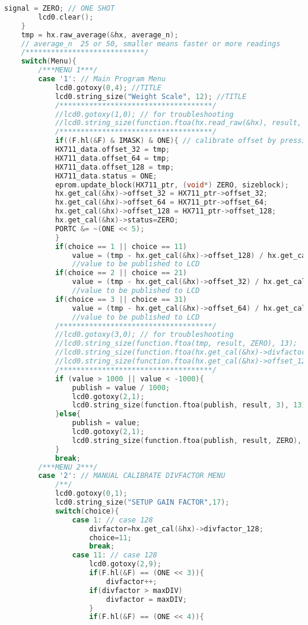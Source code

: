 \begin{lstlisting}[language=C, caption={main.c}, label=main-c, captionpos=b]
		signal = ZERO; // ONE SHOT
		lcd0.clear();
	}
	tmp = hx.raw_average(&hx, average_n); 
	// average_n  25 or 50, smaller means faster or more readings
	/****************************/
	switch(Menu){
		/***MENU 1***/
		case '1': // Main Program Menu
			lcd0.gotoxy(0,4); //TITLE
			lcd0.string_size("Weight Scale", 12); //TITLE
			/************************************/
			//lcd0.gotoxy(1,0); // for troubleshooting
			//lcd0.string_size(function.ftoa(hx.read_raw(&hx), result, ZERO), 13);
			/************************************/
			if((F.hl(&F) & IMASK) & ONE){ // calibrate offset by pressing button 1
			HX711_data.offset_32 = tmp;
			HX711_data.offset_64 = tmp;
			HX711_data.offset_128 = tmp;
			HX711_data.status = ONE;
			eprom.update_block(HX711_ptr, (void*) ZERO, sizeblock);
			hx.get_cal(&hx)->offset_32 = HX711_ptr->offset_32;
			hx.get_cal(&hx)->offset_64 = HX711_ptr->offset_64;
			hx.get_cal(&hx)->offset_128 = HX711_ptr->offset_128;
			hx.get_cal(&hx)->status=ZERO;
			PORTC &= ~(ONE << 5);
			}
			if(choice == 1 || choice == 11)
				value = (tmp - hx.get_cal(&hx)->offset_128) / hx.get_cal(&hx)->divfactor_128; 
				//value to be published to LCD
			if(choice == 2 || choice == 21)
				value = (tmp - hx.get_cal(&hx)->offset_32) / hx.get_cal(&hx)->divfactor_32; 
				//value to be published to LCD
			if(choice == 3 || choice == 31)
				value = (tmp - hx.get_cal(&hx)->offset_64) / hx.get_cal(&hx)->divfactor_64; 
				//value to be published to LCD
			/************************************/
			//lcd0.gotoxy(3,0); // for troubleshooting
			//lcd0.string_size(function.ftoa(tmp, result, ZERO), 13);
			//lcd0.string_size(function.ftoa(hx.get_cal(&hx)->divfactor_128, result, ZERO), 13);
			//lcd0.string_size(function.ftoa(hx.get_cal(&hx)->offset_128, result, ZERO), 13);
			/************************************/
			if (value > 1000 || value < -1000){
				publish = value / 1000;
				lcd0.gotoxy(2,1);
				lcd0.string_size(function.ftoa(publish, result, 3), 13); lcd0.string_size("Kg", 4);
			}else{
				publish = value;
				lcd0.gotoxy(2,1);
				lcd0.string_size(function.ftoa(publish, result, ZERO), 13); lcd0.string_size("gram", 4);
			}
			break;
		/***MENU 2***/
		case '2': // MANUAL CALIBRATE DIVFACTOR MENU
			/**/
			lcd0.gotoxy(0,1);
			lcd0.string_size("SETUP GAIN FACTOR",17);
			switch(choice){
				case 1: // case 128
					divfactor=hx.get_cal(&hx)->divfactor_128;
					choice=11;
					break;
				case 11: // case 128
					lcd0.gotoxy(2,9);
					if(F.hl(&F) == (ONE << 3)){
						divfactor++;
					if(divfactor > maxDIV)
						divfactor = maxDIV;
					}
					if(F.hl(&F) == (ONE << 4)){

\end{lstlisting}
